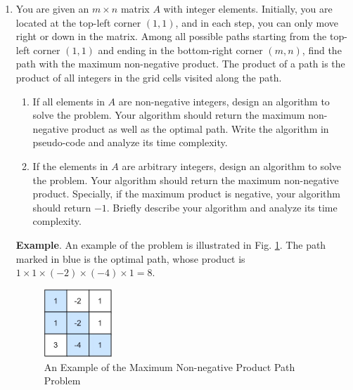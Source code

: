 \documentclass[12pt,a4paper]{article}
\theoremstyle{definition}
\begin{document}
\begin{enumerate}
	\item You are given an $m \times n$ matrix $A$ with integer elements. Initially, you are located at the top-left corner $(1, 1)$, and in each step, you can only move right or down in the matrix. Among all possible paths starting from the top-left corner $(1, 1)$ and ending in the bottom-right corner $(m, n)$, find the path with the maximum non-negative product. The product of a path is the product of all integers in the grid cells visited along the path.
	\begin{enumerate}
		\item If all elements in $A$ are non-negative integers, design an algorithm to solve the problem. Your algorithm should return the maximum non-negative product as well as the optimal path. Write the algorithm in pseudo-code and analyze its time complexity.
		\item If the elements in $A$ are arbitrary integers, design an algorithm to solve the problem. Your algorithm should return the maximum non-negative product. Specially, if the maximum product is negative, your algorithm should return $-1$. Briefly describe your algorithm and analyze its time complexity.
	\end{enumerate}

	\textbf{Example}. An example of the problem is illustrated in Fig. \ref{Fig-P3Example}. The path marked in blue is the optimal path, whose product is $1\times 1\times (-2)\times (-4)\times 1 = 8$.
	
	\begin{figure}[h]
		\centering
		\includegraphics[width=1in]{Fig-P3Example.jpeg}
		\caption{An Example of the Maximum Non-negative Product Path Problem}\label{Fig-P3Example}
	\end{figure}
	

\end{enumerate}
\end{document}
